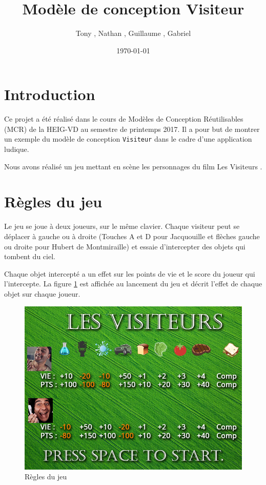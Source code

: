 \documentclass[11pt,a4paper,twoside]{article}
\title{\huge\bfseries Modèle de conception Visiteur}
\author{Tony \bsc{Clavien}, Nathan \bsc{Gonzalez Montes}, Guillaume \bsc{Milani}, Gabriel \bsc{Luthier}}
\date{\today}
\begin{document}
\maketitle
%
\section*{Introduction}
Ce projet a été réalisé dans le cours de Modèles de Conception Réutilisables (MCR) de la HEIG-VD au semestre de printemps 2017. Il a pour but de montrer un exemple du modèle de conception \texttt{Visiteur} dans le cadre d'une application ludique.

Nous avons réalisé un jeu mettant en scène les personnages du film \og Les Visiteurs \fg.

\section*{Règles du jeu}
Le jeu se joue à deux joueurs, sur le même clavier. Chaque visiteur peut se déplacer à gauche ou à droite (Touches A et D pour Jacquouille et flèches gauche ou droite pour Hubert de Montmiraille) et essaie d'intercepter des objets qui tombent du ciel.

Chaque objet intercepté a un effet sur les points de vie et le score du joueur qui l'intercepte. La figure \ref{regles} est affichée au lancement du jeu et décrit l'effet de chaque objet sur chaque joueur.
\begin{figure}[!ht]
	\center
	\includegraphics[scale=0.5]{../Game/src/resources/images/regles}
	\caption{Règles du jeu}
	\label{regles}
\end{figure}
\end{document}
